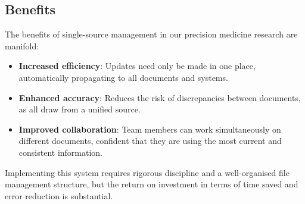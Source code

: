 \subsection{Benefits}

The benefits of single-source management in our precision medicine research are manifold:
\begin{itemize}
    \item \textbf{Increased efficiency}: Updates need only be made in one place, automatically propagating to all documents and systems.
    \item \textbf{Enhanced accuracy}: Reduces the risk of discrepancies between documents, as all draw from a unified source.
    \item \textbf{Improved collaboration}: Team members can work simultaneously on different documents, confident that they are using the most current and consistent information.
\end{itemize}

Implementing this system requires rigorous discipline and a well-organised file management structure, but the return on investment in terms of time saved and error reduction is substantial.

